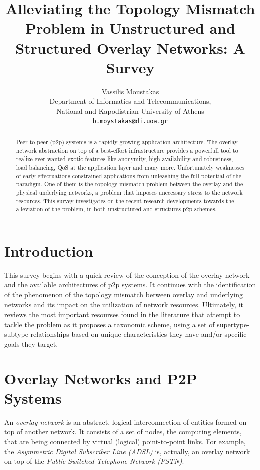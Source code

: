 \documentclass[a4paper,10pt]{article}
\title{Alleviating the Topology Mismatch Problem in Unstructured and Structured Overlay Networks: A Survey}
\author{
Vassilis Moustakas\\
Department of Informatics and Telecommunications,\\
National and Kapodistrian University of Athens\\
\mbox{\texttt{b.moystakas@di.uoa.gr}}
}
\begin{document}
\maketitle

\begin{abstract}
Peer-to-peer (p2p) systems is a rapidly growing application architecture. The overlay network abstraction on top of a best-effort infrastructure provides a powerfull tool to realize ever-wanted exotic features like anonymity, high availability and robustness, load balancing, QoS at the application layer and many more. Unfortunately weaknesses of early effectuations constrained applications from unleashing the full potential of the paradigm. One of them is the topology mismatch problem between the overlay and the physical underlying networks, a problem that imposes unecessary stress to the network resources. This survey investigates on the recent research developments towards the alleviation of the problem, in both unstructured and structures p2p schemes.
\end{abstract}

\section{Introduction}



This survey begins with a quick review of the conception of the overlay network and the available architectures of p2p systems. It continues with the identification of the phenomenon of the topology mismatch between overlay and underlying networks and its impact on the utilization of network resources. Ultimately, it reviews the most important resourses found in the literature that attempt to tackle the problem as it proposes a taxonomic scheme, using a set of supertype-subtype relationships based on unique characteristics they have and/or specific goals they target.

\section{Overlay Networks and P2P Systems}
An \emph{overlay network} is an abstract, logical interconnection of entities formed on top of another network. It consists of a set of nodes, the computing elements, that are being connected by virtual (logical) point-to-point links. For example, the \emph{Asymmetric Digital Subscriber Line (ADSL)} is, actually, an overlay network on top of the \emph{Public Switched Telephone Network (PSTN)}.
\end{document}
